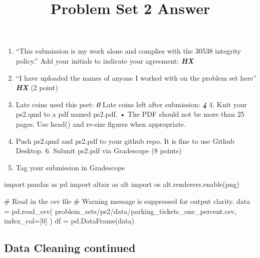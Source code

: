\documentclass[
  letterpaper,
  DIV=11,
  numbers=noendperiod]{scrartcl}
\title{Problem Set 2 Answer}
\author{}
\date{}
\newenvironment{Shaded}{\begin{snugshade}}{\end{snugshade}}
\newcommand{\CommentTok}[1]{\textcolor[rgb]{0.37,0.37,0.37}{#1}}
\newcommand{\DecValTok}[1]{\textcolor[rgb]{0.68,0.00,0.00}{#1}}
\newcommand{\ImportTok}[1]{\textcolor[rgb]{0.00,0.46,0.62}{#1}}
\newcommand{\NormalTok}[1]{\textcolor[rgb]{0.00,0.23,0.31}{#1}}
\newcommand{\OperatorTok}[1]{\textcolor[rgb]{0.37,0.37,0.37}{#1}}
\newcommand{\StringTok}[1]{\textcolor[rgb]{0.13,0.47,0.30}{#1}}
\providecommand{\tightlist}{%
  \setlength{\itemsep}{0pt}\setlength{\parskip}{0pt}}\usepackage{longtable,booktabs,array}
\begin{document}
\maketitle


\begin{enumerate}
\def\labelenumi{\arabic{enumi}.}
\tightlist
\item
  ``This submission is my work alone and complies with the 30538
  integrity policy.'' Add your initials to indicate your agreement:
  \textbf{\emph{HX}}
\item
  ``I have uploaded the names of anyone I worked with on the problem set
  here'' \textbf{\emph{HX}} (2 point)
\item
  Late coins used this pset: \textbf{\emph{0}} Late coins left after
  submission: \textbf{\emph{4}} 4. Knit your ps2.qmd to a pdf named
  ps2.pdf. • The PDF should not be more than 25 pages. Use head() and
  re-size figures when appropriate.
\item
  Push ps2.qmd and ps2.pdf to your github repo. It is fine to use Github
  Desktop. 6. Submit ps2.pdf via Gradescope (8 points)
\item
  Tag your submission in Gradescope
\end{enumerate}

\begin{Shaded}
\begin{Highlighting}[]
\ImportTok{import}\NormalTok{ pandas }\ImportTok{as}\NormalTok{ pd}
\ImportTok{import}\NormalTok{ altair }\ImportTok{as}\NormalTok{ alt}
\ImportTok{import}\NormalTok{ os}
\NormalTok{alt.renderers.enable(}\StringTok{\textquotesingle{}png\textquotesingle{}}\NormalTok{)}

\CommentTok{\# Read in the csv file}
\CommentTok{\# Warning message is suppressed for output clarity.}
\NormalTok{data }\OperatorTok{=}\NormalTok{ pd.read\_csv(}
    \StringTok{\textquotesingle{}problem\_sets/ps2/data/parking\_tickets\_one\_percent.csv\textquotesingle{}}\NormalTok{, }
\NormalTok{    index\_col}\OperatorTok{=}\NormalTok{[}\DecValTok{0}\NormalTok{]}
\NormalTok{    )}
\NormalTok{df }\OperatorTok{=}\NormalTok{ pd.DataFrame(data)}
\end{Highlighting}
\end{Shaded}

\subsection{Data Cleaning continued}\label{data-cleaning-continued}
\end{document}
